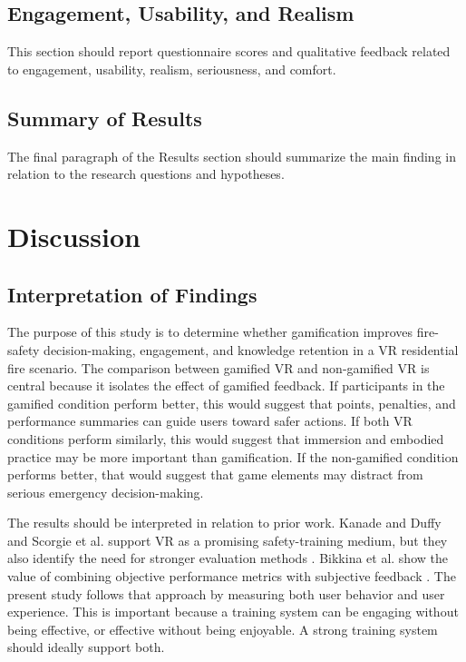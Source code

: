 \documentclass[manuscript, review]{acmart}
\begin{document}
{\subsection{Engagement, Usability, and Realism}

This section should report questionnaire scores and qualitative feedback related to engagement, usability, realism, seriousness, and comfort.

\subsection{Summary of Results}

The final paragraph of the Results section should summarize the main finding in relation to the research questions and hypotheses.

\section{Discussion}
\label{sec:discussion}

\subsection{Interpretation of Findings}

The purpose of this study is to determine whether gamification improves fire-safety decision-making, engagement, and knowledge retention in a VR residential fire scenario. The comparison between gamified VR and non-gamified VR is central because it isolates the effect of gamified feedback. If participants in the gamified condition perform better, this would suggest that points, penalties, and performance summaries can guide users toward safer actions. If both VR conditions perform similarly, this would suggest that immersion and embodied practice may be more important than gamification. If the non-gamified condition performs better, that would suggest that game elements may distract from serious emergency decision-making.

The results should be interpreted in relation to prior work. Kanade and Duffy and Scorgie et al. support VR as a promising safety-training medium, but they also identify the need for stronger evaluation methods \cite{kanade2022use,scorgie2024virtual}. Bikkina et al. show the value of combining objective performance metrics with subjective feedback \cite{bikkina2025learnings}. The present study follows that approach by measuring both user behavior and user experience. This is important because a training system can be engaging without being effective, or effective without being enjoyable. A strong training system should ideally support both.

}
\end{document}
